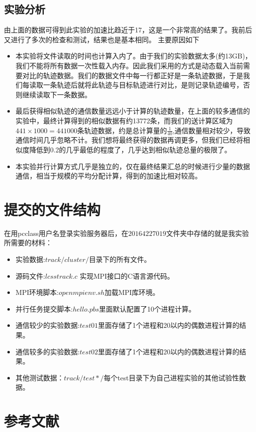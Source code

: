 \documentclass[UTF8]{ctexart}
\begin{document}
\subsection{实验分析}

由上面的数据可得到此实验的加速比趋近于17，这是一个非常高的结果了。我前后又进行了多次的检查和测试，结果也是基本相同。
主要原因如下
\begin{itemize}
	\item 本实验将文件读取的时间也计算入内了。由于我们的实验数据太多(约13GB)，我们不能将所有数据一次性载入内存。因此我们采用的方式是动态载入当前需要对比的轨迹数据。我们的数据文件中每一行都正好是一条轨迹数据，于是我们每读取一条轨迹后就将此轨迹与目标轨迹进行对比，是则记录轨迹编号，否则继续读取下一条数据。
	\item 最后获得相似轨迹的通信数量远远小于计算的轨迹数量，在上面的较多通信的实验中，最终计算得到的相似数据有约13772条，而我们的送计算区域为$441\times1000=441000$条轨迹数据，约是总计算量的$\frac{1}{40}$,通信数量相对较少，导致通信时间几乎忽略不计。我们想将最终获得的数据再调更多，但我们已经将相似度降低到0.2的几乎最低的程度了，几乎达到相似轨迹总量的极限了。
	\item 本实验并行计算方式几乎是独立的，仅在最终结果汇总的时候进行少量的数据通信，相当于规模的平均分配计算，得到的加速比相对较高。
\end{itemize}

\section{提交的文件结构}\label{sec5}
在用pcclass用户名登录实验服务器后，在$20164227019$文件夹中存储的就是我实验所需要的材料：

\begin{itemize}
	\item 实验数据:$track/cluster/$目录下的所有文件。
	\item 源码文件:$lcsstrack.c$ 实现MPI接口的C语言源代码。
	\item MPI环境脚本:$openmpienv.sh$加载MPI库环境。
	\item 并行任务提交脚本:$hello.pbs$里面默认配置了10个进程计算。
	\item 通信较少的实验数据:$test01$里面存储了1个进程和20以内的偶数进程计算的结果。
	\item 通信较多的实验数据:$test02$里面存储了1个进程和20以内的偶数进程计算的结果。
	\item 其他测试数据：$track/test*/$每个test目录下为自己进程实验的其他试验性数据。
\end{itemize}

\section{参考文献}\label{sec:sec4}


\end{document}

